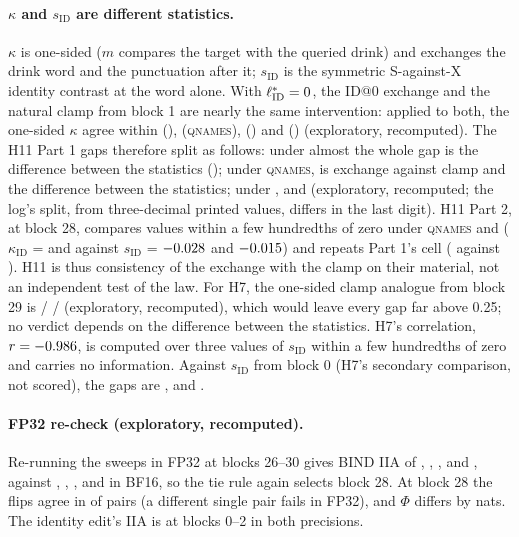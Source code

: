 \paragraph{$\kappa$ and $s_{\mathrm{ID}}$ are different statistics.} $\kappa$ is one-sided ($m$ compares the target with the queried drink) and exchanges the drink word and the punctuation after it; $s_{\mathrm{ID}}$ is the symmetric S-against-X identity contrast at the word alone. With $\ell^*_{\mathrm{ID}} = 0{}$, the ID@0 exchange and the natural clamp from block 1 are nearly the same intervention: applied to both, the one-sided $\kappa$ agree within \PkClampAgreeNone{} (\fmtNone{}), \PkClampAgreeQnames{} (\textsc{qnames}), \PkClampAgreeOpt{} (\fmtOpt{}) and \PkClampAgreeLetter{} (\fmtLetter{}) (exploratory, recomputed). The H11 Part 1 gaps therefore split as follows: under \fmtNone{} almost the whole gap is the difference between the statistics (\PkClampStatGapNone{}); under \textsc{qnames}, \PkClampAgreeQnames{} is exchange against clamp and \PkClampStatGapQnames{} the difference between the statistics; under \fmtOpt{}, \PkClampAgreeOpt{} and \PkClampStatGapOpt{} (exploratory, recomputed; the log's split, from three-decimal printed values, differs in the last digit). H11 Part 2, at block 28, compares values within a few hundredths of zero under \textsc{qnames} and \fmtOpt{} ($\kappa_{\mathrm{ID}}$ = \PkKappaIdTwentyeightQnames{} and \PkKappaIdTwentyeightOpt{} against $s_{\mathrm{ID}}$ = $-0.028$ and $-0.015$) and repeats Part 1's \fmtNone{} cell (\PkKappaIdTwentyeightNone{} against \HsevenSidNone{}). H11 is thus consistency of the exchange with the clamp on their material, not an independent test of the law. For H7, the one-sided clamp analogue from block 29 is \PkClampKappaNoneTwentynine{} / \PkClampKappaQnamesTwentynine{} / \PkClampKappaOptTwentynine{} (exploratory, recomputed), which would leave every gap far above 0.25; no verdict depends on the difference between the statistics. H7's correlation, $r = -0.986$, is computed over three values of $s_{\mathrm{ID}}$ within a few hundredths of zero and carries no information. Against $s_{\mathrm{ID}}$ from block 0 (H7's secondary comparison, not scored), the gaps are \HsevenGapZeroNone{}, \HsevenGapZeroQnames{} and \HsevenGapZeroOpt{}.

\paragraph{FP32 re-check (exploratory, recomputed).} Re-running the \fmtNone{} sweeps in FP32 at blocks 26--30 gives BIND IIA of \PkFpIIATwentysix{}, \PkFpIIATwentyseven{}, \PkFpIIATwentyeight{}, \PkFpIIATwentynine{} and \PkFpIIAThirty{}, against \PkBfIIATwentysix{}, \PkBfIIATwentyseven{}, \PkBfIIATwentyeight{}, \PkBfIIATwentynine{} and \PkBfIIAThirty{} in BF16, so the tie rule again selects block 28. At block 28 the flips agree in \PkFpAgree{} of pairs (a different single pair fails in FP32), and $\Phi$ differs by \PkFpPhiDiff{} nats. The identity edit's IIA is \PkFpIdIIAMin{} at blocks 0--2 in both precisions.

